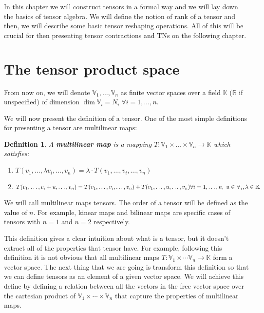 \documentclass[11pt,a4paper,openright,oneside]{book}
\numberwithin{equation}{section}
\newtheorem{defn0}{Definition}[chapter]
\newenvironment{definition}{ \begin{defn0}}{\end{defn0}}
\begin{document}
\fi


In this chapter we will construct tensors in a formal way and we will lay down the basics of tensor algebra. We will
define the notion of rank of a tensor and then,
we will describe some basic tensor reshaping operations.
All of this will be crucial for then presenting tensor contractions and \gls{TN}s on the following chapter.

\section{The tensor product space}

From now on, we will denote $\mathbb{V}_1, \dots, \mathbb{V}_n$ as finite vector spaces over a field $\mathbb{K}$ ($\mathbb{R}$ if unspecified) of dimension $\dim{\mathbb{V}_i} = N_i \; \forall i = 1, \dots, n$.

We will now present the definition of a tensor. One of the most simple definitions for presenting a tensor
are multilinear maps:

\begin{definition}
    A \textbf{multilinear map} is a mapping ${T: \mathbb{V}_1 \times \dots \times \mathbb{V}_n \rightarrow \mathbb{K}}$ which satisfies:
    \begin{enumerate}
        \item $T(v_1, \dots, \lambda v_i, \dots, v_n) = \lambda \cdot T(v_1, \dots, v_i, \dots, v_n)$
        \item $T(v_1, \dots, v_i + u, \dots, v_n) = T(v_1, \dots, v_i, \dots, v_n) + T(v_1, \dots, u, \dots, v_n) \\ {\forall i = 1, \dots, n, \; u \in \mathbb{V}_i, \lambda \in \mathbb{K}}$
    \end{enumerate}
    \label{def:multilinear-maps}
\end{definition}


We will call multilinear maps tensors. The order of a tensor will be defined as the value of $n$.
For example, kinear maps and bilinear maps are specific cases of tensors with $n=1$ and $n=2$ respectively.

This definition gives a clear intuition about what is a tensor, but it doesn't extract all of the properties that tensor have.
For example, following this definition it is not obvious that all multilinear maps $T: \mathbb{V}_1 \times \cdots \mathbb{V}_n \rightarrow \mathbb{K}$
form a vector space. The next thing that we are going is transform this definition so that we can define tensors
as an element of a given vector space. We will achieve this define by defining a relation between all the vectors in the free vector space
over the cartesian product of $\mathbb{V}_1 \times \cdots \times \mathbb{V}_n$ that capture the properties of multilinear maps.
\end{document}
